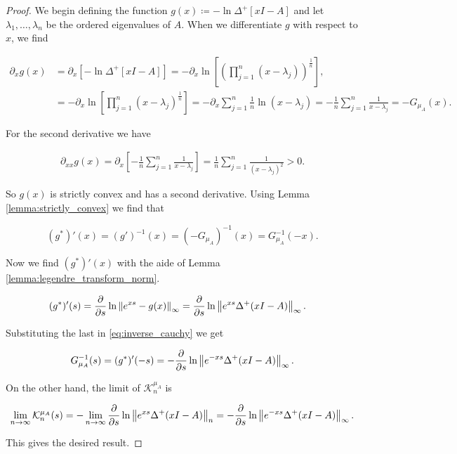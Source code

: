 \begin{proof}
    
    We begin defining the function $g(x) \coloneqq -\ln \Delta^+[xI - A]$ and let $\lambda_1, \dots, \lambda_n$ be the ordered eigenvalues of $A$. When we differentiate $g$ with respect to $x$, we find 

    \begin{align*}
        \partial_x g(x) &= \partial_x \left[-\ln \Delta^+[xI - A]\right] = -\partial_x \ln\left[ \left(\prod_{j=1}^n (x - \lambda_j) \right)^{\frac1n}\right], \\
        &= -\partial_x \ln \left[ \prod_{j=1}^n (x-\lambda_j)^{\frac1n} \right] = - \partial_x \sum_{j=1}^n \frac1n \ln (x-\lambda_j) = -\frac1n \sum_{j=1}^n  \frac1{x-\lambda_j} = - G_{\mu_A}(x).
    \end{align*}

    For the second derivative we have

    \begin{align*}
        \partial_{xx} g(x) = \partial_x \left[ -\frac1n \sum_{j=1}^n  \frac1{x-\lambda_j} \right] = \frac1n \sum_{j=1}^n \frac{1}{(x-\lambda_j)^2} > 0.
    \end{align*}

    So $g(x)$ is strictly convex and has a second derivative. Using Lemma \ref{lemma:strictly_convex} we find that 

    \begin{equation} \label{eq:inverse_cauchy}
        (g^*)'(x) = (g')^{-1}(x) = (-G_{\mu_A})^{-1}(x) = G_{\mu_A}^{-1}(-x).
    \end{equation}

    Now we find $(g^*)'(x)$ with the aide of Lemma \ref{lemma:legendre_transform_norm}.

    \begin{align*}
        (g^*)'(s) &= \frac{\partial}{\partial s} \ln \left\lVert e^{xs} - g(x) \right\rVert_\infty = \frac{\partial}{\partial s} \ln \left\lVert e^{xs} \Delta^+(xI - A) \right\rVert_\infty.
    \end{align*}

    Substituting the last in \eqref{eq:inverse_cauchy} we get 

    \begin{equation*}
        G_{\mu_A}^{-1}(s) = (g^*)'(-s) = -\frac{\partial}{\partial s} \ln \left\lVert e^{-xs} \Delta^+(xI - A) \right\rVert_\infty.
    \end{equation*}

    On the other hand, the limit of $\mathcal K_n^{\mu_A}$ is 

    \begin{equation*}
        \lim_{n\to\infty}  \mathcal K_n^{\mu_A}(s) = - \lim_{n\to\infty} \frac{\partial}{\partial s} \ln \left\lVert e^{xs}\Delta^+(xI - A) \right\rVert_n =  -\frac{\partial}{\partial s} \ln \left\lVert e^{-xs} \Delta^+(xI - A) \right\rVert_\infty.
    \end{equation*}

    This gives the desired result.
\end{proof}


